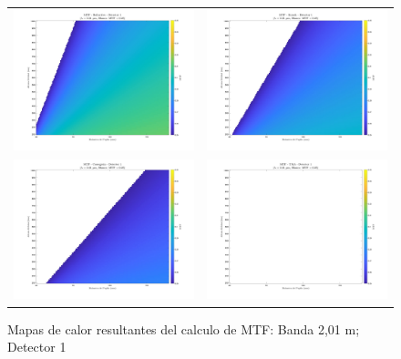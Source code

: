 \begin{landscape}
\begin{figure}[p]
\centering
\setlength{\tabcolsep}{2pt}
\renewcommand{\arraystretch}{0}

\begin{tabular}{cc}
\includegraphics[width=0.48\linewidth]{4.Payload/MTF/MTF_Lambda2_Detector1_Telescopio1_heatmap.jpg} &
\includegraphics[width=0.48\linewidth]{4.Payload/MTF/MTF_Lambda2_Detector1_Telescopio2_heatmap.jpg} \\
\includegraphics[width=0.48\linewidth]{4.Payload/MTF/MTF_Lambda2_Detector1_Telescopio3_heatmap.jpg} &
\includegraphics[width=0.48\linewidth]{4.Payload/MTF/MTF_Lambda2_Detector1_Telescopio4_heatmap.jpg} \\
\end{tabular}
\caption{Mapas de calor resultantes del calculo de MTF: Banda 2,01 \textmu m; Detector 1}
\end{figure}
\end{landscape}


